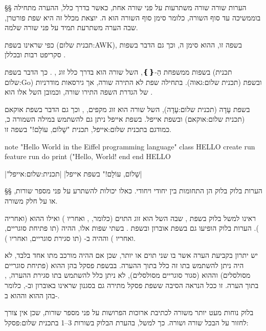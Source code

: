 §§ הערות שורה
 שורה משתרעות על פני שורה אחת, כאשר בדרך כלל, ההערה מתחילה ב וממשיכה
עד סוף השורה, כלומר סימן סוף השורה הוא ה. יוצאת מכלל זה היא שפת
פורטרן, שבה הערה משתרעת תמיד על פני שורה שלמה.

כפי שראינו בשפת  ( תכנית שלום:AWK), בשפה זו, ה הוא סימן
ה , וכך גם הדבר בשפות סקריפט רבות ובכללן .

בשפות ממשפחת הַ-{❴❵}, ה של  שורה הוא בדרך כלל זוג ,
. כך הדבר בשפת  ( תכנית שלום:Go) ובשפת  ( תכנית
שלום:גאוה). בתחילה שפת  לא התירה  שורה, אך גירסאות מודרניות של הגדרת
השפה התירו  שורה, וכמובן ה של אלו הוא .

בשפת עָדָה ( תכנית שלום:עָדָה), ה של  שורה הוא זוג מקפים, ,
וכך גם הדבר בשפת אוקאם ( תכנית שלום:אוקאם) ובשפת אייפל. בשפת אייפל ניתן
גם להשתמש במילה השמורה  כ, כמודגם ב תכנית שלום:אייפל, תכנית
"שָׁלוֹם, עוֹלָם!" בשפה זו.

\begin{תכנית}
\begin{EIFFELn}
  note "Hello World in the Eiffel programming language"
  class HELLO
  create run
  feature run
  do
  print ("Hello, World!%
  end
  end HELLO
\end{EIFFELn}
|"שָׁלוֹם, עוֹלָם!" בשפת אייפל|
|תכנית:שלום:אייפל|
\end{תכנית}

§§ הערות בלוק
 בלוק הן  התחומות בין  יחודי ו יחודי.  כאלו יכולות
להשתרע על פני מספר שורות, או על חלק משורה.

ראינו למשל  בלוק בשפת , שבה ה של  הוא זוג התוים 
(כלומר, , ואחריו ) ואילו ה הוא  ( ואחריה
). הערות בלוק הופיעו גם בשפת אוברון ובשפת . בשתי שפות אלו,
ה היה  (תו פתיחת סוגריים, ואחריו ) וה היה ב-
(תו סגירת סוגריים, ואחריו ).

יש יתרון בקביעת  הערה אשר בו שני תוים או יותר, שכן אם ה היה מורכב
מתו אחד בלבד, לא היה ניתן להשתמש בתו זה כלל בתוך ההערה. ב בשפת פסקל בהן
ה הוא  (פתיחת סוגריים מסולסלים) וה הוא  (סגור סוגריים
מסולסלים), לא ניתן כלל להשתמש בתו סגירת ההערה, , בתוך הערה. זו ככל
הנראה הסיבה ששפת פסקל מתירה גם  בסגנון שראינו באוברון וב-,
כלומר  בהן ה הוא  וה הוא ב-.

 בלוק נוחות מעט יותר מ שורה לכתיבת  ארוכות הפרושות על פני
מספר שורות, שכן אין צורך לחזור על ה בכל שורה ושורה. כך למשל, בהערת הבלוק
בשורות 3--1 ב תכנית שלום:פסקל{}:

